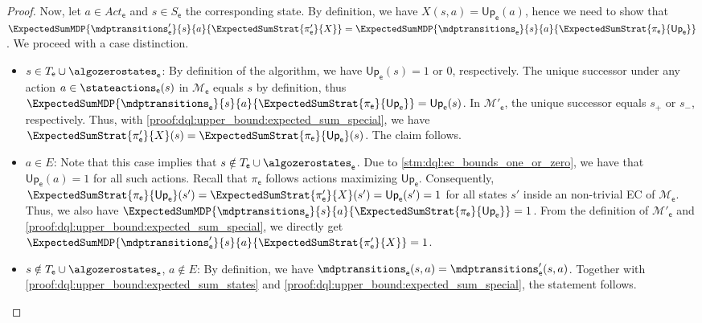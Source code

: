 \documentclass{article}
\newcommand{\unionSym}{\cup}
\newcommand{\unionBin}{\mathbin{\unionSym}}
\newcommand{\union}{\unionBin}
\newcommand{\MDP}{\mathcal{M}}
\newcommand{\States}{S}
\newcommand{\Actions}{Act}
\newcommand{\strategy}{\pi}
\newcommand{\upperbound}{\mathsf{Up}}
\newcommand{\targetstate}{s_+}
\newcommand{\sinkstate}{s_-}
\newcommand{\targetset}{T}
\newcommand{\algoepisode}{\mathsf{e}}
\begin{document}
\begin{proof}
	Now, let $a \in \Actions_\algoepisode$ and $s \in \States_\algoepisode$ the corresponding state.
	By definition, we have $X(s, a) = \upperbound_{\algoepisode}(a)$, hence we need to show that $\ExpectedSumMDP{\mdptransitions_\algoepisode'}{s}{a}{\ExpectedSumStrat{\strategy'_\algoepisode}{X}} = \ExpectedSumMDP{\mdptransitions_\algoepisode}{s}{a}{\ExpectedSumStrat{\strategy_\algoepisode}{\upperbound_{\algoepisode}}}$.
	We proceed with a case distinction.
	\begin{itemize}
		\item
		$s \in \targetset_\algoepisode \union \algozerostates_\algoepisode$: By definition of the algorithm, we have $\upperbound_\algoepisode(s) = 1$ or $0$, respectively.
		The unique successor under any action $a \in \stateactions_\algoepisode(s)$ in $\MDP_\algoepisode$ equals $s$ by definition, thus $\ExpectedSumMDP{\mdptransitions_\algoepisode}{s}{a}{\ExpectedSumStrat{\strategy_\algoepisode}{\upperbound_{\algoepisode}}} = \upperbound_\algoepisode(s)$.
		In $\MDP'_\algoepisode$, the unique successor equals $\targetstate$ or $\sinkstate$, respectively.
		Thus, with \ref{proof:dql:upper_bound:expected_sum_special}, we have $\ExpectedSumStrat{\strategy'_\algoepisode}{X}(s) = \ExpectedSumStrat{\strategy_\algoepisode}{\upperbound_{\algoepisode}}(s)$.
		The claim follows.

		\item
		$a \in E$: Note that this case implies that $s \notin \targetset_\algoepisode \union \algozerostates_\algoepisode$.
		Due to \cref{stm:dql:ec_bounds_one_or_zero}, we have that $\upperbound_\algoepisode(a) = 1$ for all such actions.
		Recall that $\strategy_\algoepisode$ follows actions maximizing $\upperbound_\algoepisode$.
		Consequently, $\ExpectedSumStrat{\strategy_\algoepisode}{\upperbound_{\algoepisode}}(s') = \ExpectedSumStrat{\strategy'_\algoepisode}{X}(s') = \upperbound_{\algoepisode}(s') = 1$ for all states $s'$ inside an non-trivial EC of $\MDP_\algoepisode$.
		Thus, we also have $\ExpectedSumMDP{\mdptransitions_\algoepisode}{s}{a}{\ExpectedSumStrat{\strategy_\algoepisode}{\upperbound_{\algoepisode}}} = 1$.
		From the definition of $\MDP'_\algoepisode$ and \ref{proof:dql:upper_bound:expected_sum_special}, we directly get $\ExpectedSumMDP{\mdptransitions_\algoepisode'}{s}{a}{\ExpectedSumStrat{\strategy'_\algoepisode}{X}} = 1$.

		\item
		$s \notin \targetset_\algoepisode \union \algozerostates_\algoepisode$, $a \notin E$: By definition, we have $\mdptransitions_\algoepisode(s, a) = \mdptransitions_\algoepisode'(s, a)$.
		Together with \ref{proof:dql:upper_bound:expected_sum_states} and \ref{proof:dql:upper_bound:expected_sum_special}, the statement follows.
	\end{itemize}


\end{proof}
\end{document}
